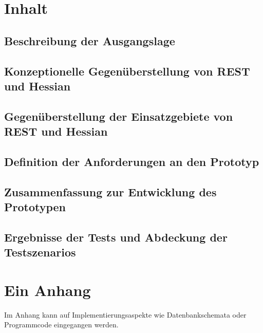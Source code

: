 \documentclass[listof=totocnumbered, bibliography=totocnumbered]{scrreprt}
\begin{document}
  \chapter{Inhalt}
  
  
  \section{Beschreibung der Ausgangslage}
  
  
  \section{Konzeptionelle Gegenüberstellung von REST und Hessian}
  
  
  \section{Gegenüberstellung der Einsatzgebiete von REST und Hessian}
  
  
  \section{Definition der Anforderungen an den Prototyp}
  
  
  \section{Zusammenfassung zur Entwicklung des Prototypen}
  
  
  \section{Ergebnisse der Tests und Abdeckung der Testszenarios}
  
  
  
  \appendix
  
  \chapter{Ein Anhang}
  
  Im Anhang kann auf Implementierungsaspekte wie Datenbankschemata
  oder Programmcode eingegangen werden.
  
  
\end{document}
